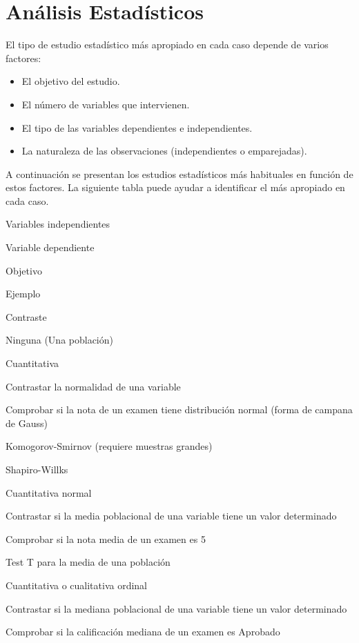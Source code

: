 \documentclass[
  a4paper,
]{scrreport}
\providecommand{\tightlist}{%
  \setlength{\itemsep}{0pt}\setlength{\parskip}{0pt}}\usepackage{longtable,booktabs,array}
\theoremstyle{definition}
\theoremstyle{definition}
\theoremstyle{remark}
\begin{document}

\hypertarget{anuxe1lisis-estaduxedsticos}{%
\chapter{Análisis Estadísticos}\label{anuxe1lisis-estaduxedsticos}}

El tipo de estudio estadístico más apropiado en cada caso depende de
varios factores:

\begin{itemize}
\tightlist
\item
  El objetivo del estudio.
\item
  El número de variables que intervienen.
\item
  El tipo de las variables dependientes e independientes.
\item
  La naturaleza de las observaciones (independientes o emparejadas).
\end{itemize}

A continuación se presentan los estudios estadísticos más habituales en
función de estos factores. La siguiente tabla puede ayudar a identificar
el más apropiado en cada caso.

Variables independientes

Variable dependiente

Objetivo

Ejemplo

Contraste

Ninguna (Una población)

Cuantitativa

Contrastar la normalidad de una variable

Comprobar si la nota de un examen tiene distribución normal (forma de
campana de Gauss)

Komogorov-Smirnov (requiere muestras grandes)

Shapiro-Willks

Cuantitativa normal

Contrastar si la media poblacional de una variable tiene un valor
determinado

Comprobar si la nota media de un examen es 5

Test T para la media de una población

Cuantitativa o cualitativa ordinal

Contrastar si la mediana poblacional de una variable tiene un valor
determinado

Comprobar si la calificación mediana de un examen es Aprobado
\end{document}
